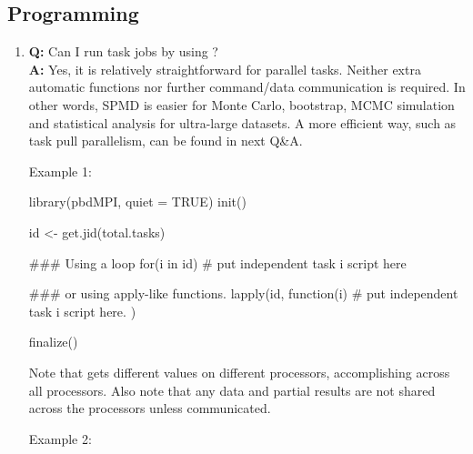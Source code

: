\subsection[Programming]{Programming}
\label{sec:programming}


\begin{enumerate}
\item {\bf\color{blue} Q:}
      Can I run task jobs by using ? \\
      {\bf\color{blue} A:}
      Yes, it is relatively straightforward for parallel
      tasks. Neither extra automatic functions nor further
      command/data communication is required.  In other words, SPMD is
      easier for Monte Carlo, bootstrap, MCMC simulation and
      statistical analysis for ultra-large datasets.
      A more efficient way, such as task pull parallelism, can be found
      in next Q\&A.

Example 1:
\begin{Code}[title=SPMD R Script]
  library(pbdMPI, quiet = TRUE)
  init()

  id <- get.jid(total.tasks)

  ### Using a loop
  for(i in id){
    # put independent task i script here
  }

  ### or using apply-like functions.
  lapply(id, function(i){
    # put independent task i script here.
  })

  finalize()
\end{Code}

Note that  gets different values on different processors,
accomplishing  across all processors. Also note that
any data and partial results are not shared across the processors
unless communicated.

Example 2:



\end{enumerate}

